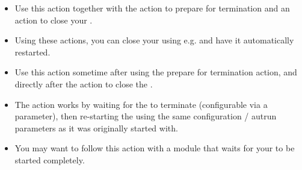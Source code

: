 
\begin{itemize}
\item Use this action together with the action to prepare for \gdaut{} termination and an action to close your \gdaut{}. 
\item Using these actions, you can close your \gdaut{} using e.g.  and have it automatically restarted.
\item Use this action sometime after using the prepare for termination action, and directly after the action to close the \gdaut{}. 
\item The action works by waiting for the \gdaut{} to terminate (configurable via a parameter), then re-starting the \gdaut{} using the same configuration / autrun parameters as it was originally started with.
\item You may want to follow this action with a module that waits for your \gdaut{} to be started completely.
\end{itemize}

